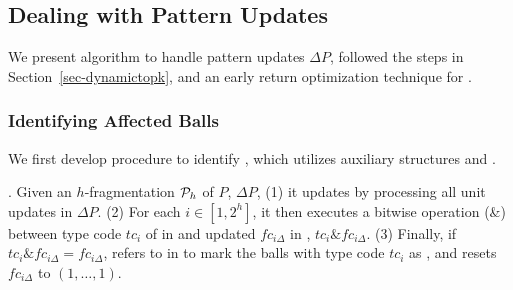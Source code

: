 \subsection{Dealing with Pattern Updates}
\label{subsec-Qinc}

We present algorithm \incp to handle pattern updates $\Delta P$, followed the steps in Section~\ref{sec-dynamictopk}, and
an early return optimization technique for \incp.










\subsubsection{Identifying Affected Balls}
\label{subsubsec-affball}

We first develop procedure \identifyaffball to identify \affballsx,
which utilizes auxiliary structures \fb and \bfc.

.
Given an $h$-fragmentation ${\cal P}_{h}$ of $P$, $\Delta P$,
(1) it updates \bfc by processing all unit updates in $\Delta P$.
(2) For each $i\in [1, 2^h]$, it then executes a bitwise  operation (\&) between type code $tc_i$ of \fs in \fb and updated $fc_{i\Delta}$ in \bfc, \ie $tc_i\& fc_{i\Delta}$.
(3) Finally, if $tc_i\& fc_{i\Delta} = fc_{i\Delta}$, \identifyaffball refers to \bs in \fb to mark the balls with type code $tc_i$ as \affballsx, and resets $fc_{i\Delta}$ to $(1, \ldots, 1)$.




